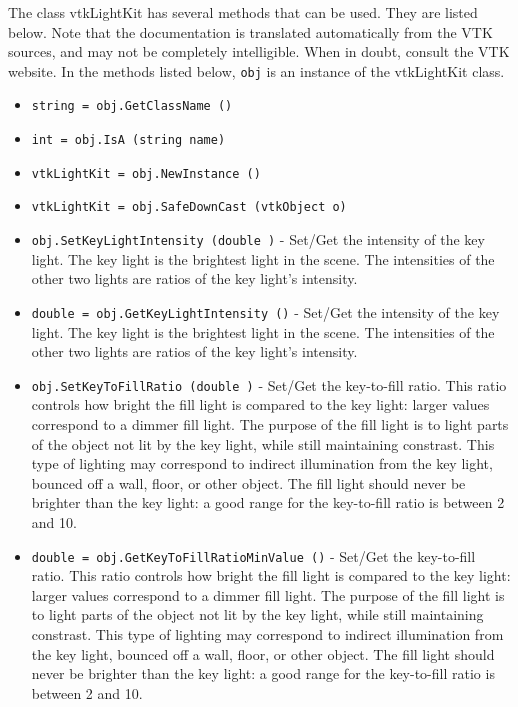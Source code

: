 The class vtkLightKit has several methods that can be used.
  They are listed below.
Note that the documentation is translated automatically from the VTK sources,
and may not be completely intelligible.  When in doubt, consult the VTK website.
In the methods listed below, \verb|obj| is an instance of the vtkLightKit class.
\begin{itemize}
\item  \verb|string = obj.GetClassName ()|

\item  \verb|int = obj.IsA (string name)|

\item  \verb|vtkLightKit = obj.NewInstance ()|

\item  \verb|vtkLightKit = obj.SafeDownCast (vtkObject o)|

\item  \verb|obj.SetKeyLightIntensity (double )| -  Set/Get the intensity of the key light.  The key light is the
 brightest light in the scene.  The intensities of the other two
 lights are ratios of the key light's intensity.  

\item  \verb|double = obj.GetKeyLightIntensity ()| -  Set/Get the intensity of the key light.  The key light is the
 brightest light in the scene.  The intensities of the other two
 lights are ratios of the key light's intensity.  

\item  \verb|obj.SetKeyToFillRatio (double )| -  Set/Get the key-to-fill ratio.  This ratio controls
 how bright the fill light is compared to the key light: larger
 values correspond to a dimmer fill light.  The purpose of the
 fill light is to light parts of the object not lit by the key
 light, while still maintaining constrast.  This type of lighting
 may correspond to indirect illumination from the key light, bounced
 off a wall, floor, or other object.  The fill light should never
 be brighter than the key light:  a good range for the key-to-fill
 ratio is between 2 and 10.

\item  \verb|double = obj.GetKeyToFillRatioMinValue ()| -  Set/Get the key-to-fill ratio.  This ratio controls
 how bright the fill light is compared to the key light: larger
 values correspond to a dimmer fill light.  The purpose of the
 fill light is to light parts of the object not lit by the key
 light, while still maintaining constrast.  This type of lighting
 may correspond to indirect illumination from the key light, bounced
 off a wall, floor, or other object.  The fill light should never
 be brighter than the key light:  a good range for the key-to-fill
 ratio is between 2 and 10.


\end{itemize}
